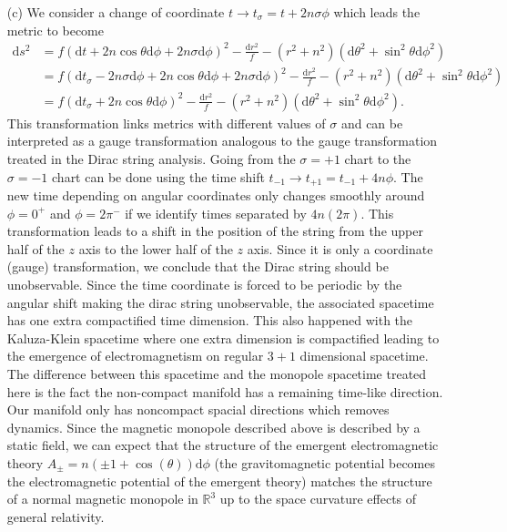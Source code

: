 \documentclass[10pt, a4paper]{article}
\begin{document}
{\begin{enumerate}
  \item[(c)] We consider a change of coordinate $t \to t_\sigma = t + 2n \sigma \phi$ which leads the metric to become
  \begin{align*}
    \text{d} s^2 &= f\left(\text{d} t + 2 n\cos \theta \text{d}\phi + 2n\sigma \text{d}\phi\right)^2-\frac{\text{d} r^2}{f}-\left(r^2+n^2\right)\left(\text{d} \theta^2+\sin ^2 \theta \text{d} \phi^2\right)\\ &=  f\left(\text{d} t_\sigma - 2n \sigma \text{d}\phi + 2 n\cos \theta \text{d}\phi + 2n\sigma \text{d}\phi \right)^2-\frac{\text{d} r^2}{f}-\left(r^2+n^2\right)\left(\text{d} \theta^2+\sin ^2 \theta \text{d} \phi^2\right)\\
    &= f\left(\text{d} t_\sigma + 2 n\cos \theta \text{d}\phi\right)^2-\frac{\text{d} r^2}{f}-\left(r^2+n^2\right)\left(\text{d} \theta^2+\sin ^2 \theta \text{d} \phi^2\right). 
  \end{align*}
  This transformation links metrics with different values of $\sigma$ and can be interpreted as a gauge transformation analogous to the gauge transformation treated in the Dirac string analysis. Going from the $\sigma = +1$ chart to the $\sigma = -1$ chart can be done using the time shift $t_{-1} \to t_{+1} = t_{-1} + 4n \phi$. The new time depending on angular coordinates only changes smoothly around $\phi = 0^+$ and $\phi = 2\pi^-$ if we identify times separated by $4n (2\pi)$. This transformation leads to a shift in the position of the string from the upper half of the $z$ axis to the lower half of the $z$ axis. Since it is only a coordinate (gauge) transformation, we conclude that the Dirac string should be unobservable. Since the time coordinate is forced to be periodic by the angular shift making the dirac string unobservable, the associated spacetime has one extra compactified time dimension. This also happened with the Kaluza-Klein spacetime where one extra dimension is compactified leading to the emergence of electromagnetism on regular $3+1$ dimensional spacetime. The difference between this spacetime and the monopole spacetime treated here is the fact the non-compact manifold has a remaining time-like direction. Our manifold only has noncompact spacial directions which removes dynamics. Since the magnetic monopole described above is described by a static field, we can expect that the structure of the emergent electromagnetic theory $A_{\pm} = n(\pm 1 +\cos(\theta))\text{d}\phi$ (the gravitomagnetic potential becomes the electromagnetic potential of the emergent theory) matches the structure of a normal magnetic monopole in $\mathbb{R}^3$ up to the space curvature effects of general relativity.  

\end{enumerate}}
\end{document}

